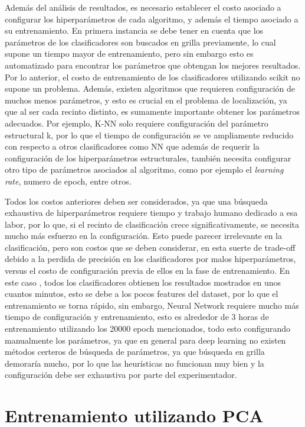 Además del análisis de resultados, es necesario establecer el costo asociado a configurar los hiperparámetros de cada algoritmo, y además el tiempo asociado a su entrenamiento. En primera instancia se debe tener en cuenta que los parámetros de los clasificadores son buscados en grilla previamente, lo cual supone un tiempo mayor de entrenamiento, pero sin embargo esto es automatizado para encontrar los parámetros que obtengan los mejores resultados. Por lo anterior, el costo de entrenamiento de los clasificadores utilizando scikit no supone un problema. Además, existen algoritmos que requieren configuración de muchos menos parámetros, y esto es crucial en el problema de localización, ya que al ser cada recinto distinto, es sumamente importante obtener los parámetros adecuados. Por ejemplo, K-NN solo requiere configuración del parámetro estructural k, por lo que el tiempo de configuración se ve ampliamente reducido con respecto a otros clasificadores como NN que además de requerir la configuración de los hiperparámetros estructurales, también necesita configurar otro tipo de parámetros asociados al algoritmo, como por ejemplo el \textit{learning rate}, numero de epoch, entre otros.

Todos los costos anteriores deben ser considerados, ya que una búsqueda exhaustiva de hiperparámetros requiere tiempo y trabajo humano dedicado a esa labor, por lo que, si el recinto de clasificación crece significativamente, se necesita mucho más esfuerzo en la configuración. Esto puede parecer irrelevante en la clasificación, pero son costos que se deben considerar, en esta suerte de trade-off debido a la perdida de precisión en los clasificadores por malos hiperparámetros, versus el costo de configuración previa de ellos en la fase de entrenamiento. En este caso , todos los clasificadores obtienen los resultados mostrados en unos cuantos minutos, esto se debe a los pocos features del dataset, por lo que el entrenamiento se torna rápido, sin embargo, Neural Network requiere mucho más tiempo de configuración y entrenamiento, esto es alrededor de 3 horas de entrenamiento utilizando los 20000 epoch mencionados, todo esto configurando manualmente los parámetros, ya que en general para deep learning no existen métodos certeros de búsqueda de parámetros, ya que búsqueda en grilla demoraría mucho, por lo que las heurísticas no funcionan muy bien y la configuración debe ser exhaustiva por parte del experimentador.

\section{Entrenamiento utilizando PCA}

